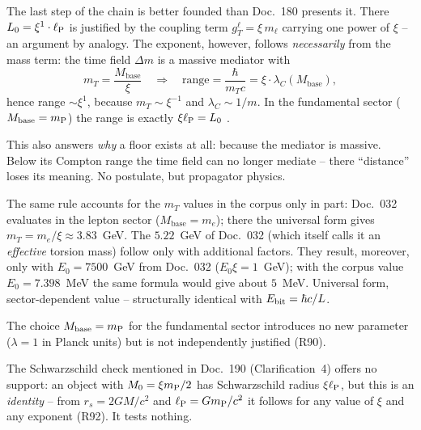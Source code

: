 \begin{tcolorbox}[proofbox, title={The floor follows from the Lagrangian \B\ (R89/R90)}]
  The last step of the chain is better founded than Doc.~180 presents it.
  There $L_0 = \xi^1\cdot\ell_{\mathrm{P}}$ is justified by the coupling term
  $g_T^\ell = \xi\, m_\ell$ carrying one power of $\xi$ -- an argument by
  analogy. The exponent, however, follows \emph{necessarily} from the mass
  term: the time field $\Delta m$ is a massive mediator with
  \begin{equation}
    m_T = \frac{M_{\mathrm{base}}}{\xi}
    \quad\Longrightarrow\quad
    \text{range} = \frac{\hbar}{m_T c}
    = \xi\cdot\lambda_C(M_{\mathrm{base}}),
  \end{equation}
  hence range $\sim\xi^1$, because $m_T\sim\xi^{-1}$ and
  $\lambda_C\sim 1/m$. In the fundamental sector ($M_{\mathrm{base}} = m_{\mathrm{P}}$)
  the range is exactly $\xi\ell_{\mathrm{P}} = L_0$ \B.

  This also answers \emph{why} a floor exists at all: because the mediator
  is massive. Below its Compton range the time field can no longer
  mediate -- there \enquote{distance} loses its meaning. No postulate, but
  propagator physics.

  The same rule accounts for the $m_T$ values in the corpus only in part:
  Doc.~032 evaluates in the lepton sector ($M_{\mathrm{base}} = m_e$); there
  the universal form gives $m_T = m_e/\xi \approx 3.83$~GeV. The $5.22$~GeV
  of Doc.~032 (which itself calls it an \emph{effective} torsion mass) follow
  only with additional factors.
  They result, moreover, only with $E_0 = 7500$~GeV from Doc.~032 ($E_0\xi = 1$~GeV);
  with the corpus value $E_0 = 7.398$~MeV the same formula would give about $5$~MeV.
  Universal form,
  sector-dependent value -- structurally identical with $E_{\mathrm{bit}} = \hbar c/L$.
\end{tcolorbox}

\begin{tcolorbox}[warnbox, title={What remains open \S}]
  The choice $M_{\mathrm{base}} = m_{\mathrm{P}}$ for the fundamental sector
  introduces no new parameter ($\lambda = 1$ in Planck units) but is not
  independently justified (R90).

  The Schwarzschild check mentioned in Doc.~190 (Clarification~4) offers
  no support: an object with $M_0 = \xi m_{\mathrm{P}}/2$ has Schwarzschild radius
  $\xi\ell_{\mathrm{P}}$, but this is an \emph{identity} -- from $r_s = 2GM/c^2$ and
  $\ell_{\mathrm{P}} = Gm_{\mathrm{P}}/c^2$ it follows for any value of $\xi$ and any exponent
  (R92). It tests nothing.
\end{tcolorbox}

